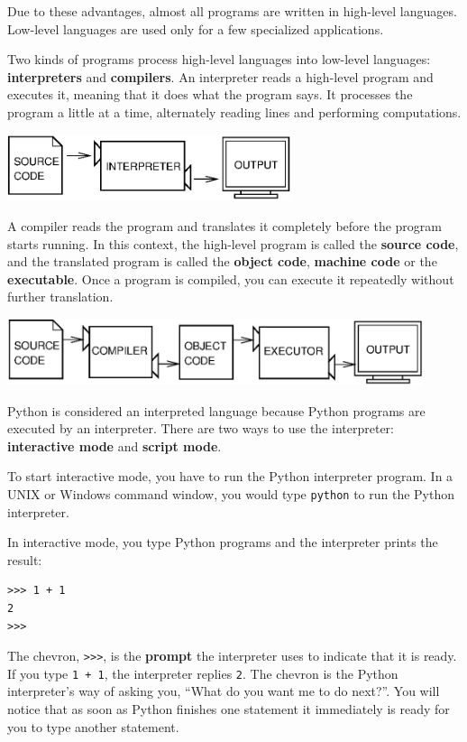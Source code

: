 \documentclass[10pt]{book}
\begin{document}
Due to these advantages, almost all programs are written in high-level
languages.  Low-level languages are used only for a few specialized
applications.


Two kinds of programs process high-level languages
into low-level languages: {\bf interpreters} and {\bf compilers}.
An interpreter reads a high-level program and executes it, meaning that it
does what the program says.  It processes the program a little at a time,
alternately reading lines and performing computations.

\beforefig
\centerline{\includegraphics[height=0.77in]{figs/interpret.eps}}
\afterfig


A compiler reads the program and translates it completely before the
program starts running.  In this context, the high-level program is
called the {\bf source code}, and the translated program is called the
{\bf object code}, {\bf machine code} or the {\bf executable}.  
Once a program is compiled, you can execute it 
repeatedly without further translation.

\beforefig
\centerline{\includegraphics[height=0.77in]{figs/compile.eps}}
\afterfig

Python is considered an interpreted language because Python programs
are executed by an interpreter.  There are two ways to use the
interpreter: {\bf interactive mode} and {\bf script mode}. 

To start interactive mode, you have to run the Python interpreter
program.
In a UNIX or Windows command window, you would type {\tt python}
to run the Python interpreter.

In interactive mode, you type Python programs and the interpreter prints
the result:


\beforeverb
\begin{verbatim}
>>> 1 + 1
2
>>>
\end{verbatim}
\afterverb
%
The chevron, {\tt >>>}, is the
{\bf prompt} the interpreter uses to indicate that it is ready.  If
you type {\tt 1 + 1}, the interpreter replies {\tt 2}.
The chevron is the Python interpreter's way of asking you, ``What
do you want me to do next?''.  You will notice that as soon as 
Python finishes one statement it immediately is ready for you to type 
another statement.
\end{document}
